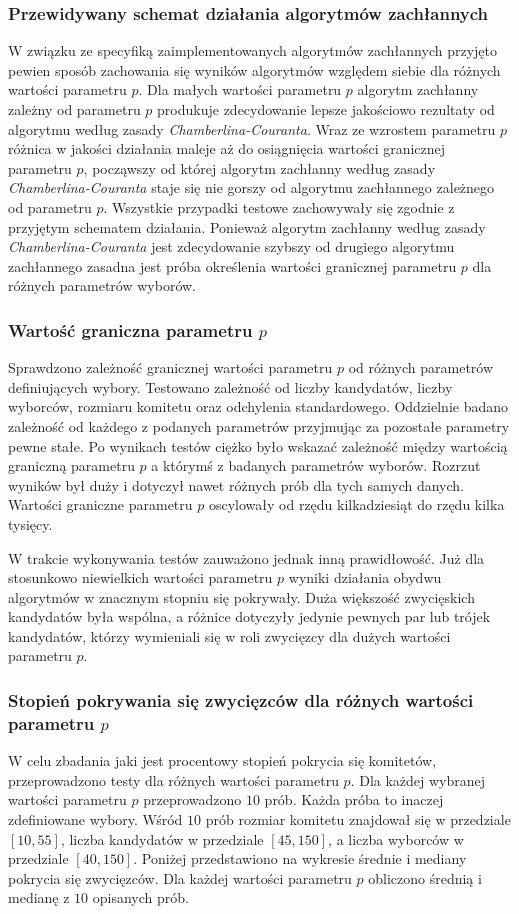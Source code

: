 \documentclass[polish,11pt]{aghthesis}
\begin{document}
\subsubsection{Przewidywany schemat działania algorytmów zachłannych}
W związku ze specyfiką zaimplementowanych algorytmów zachłannych przyjęto pewien sposób zachowania się wyników algorytmów względem siebie dla różnych wartości parametru $p$. Dla małych wartości parametru $p$ algorytm zachłanny zależny od parametru $p$ produkuje zdecydowanie lepsze jakościowo rezultaty od algorytmu według zasady \textit{Chamberlina-Couranta}. Wraz ze wzrostem parametru $p$ różnica w jakości działania maleje aż do osiągnięcia wartości granicznej parametru $p$, począwszy od której algorytm zachłanny według zasady \textit{Chamberlina-Couranta} staje się nie gorszy od algorytmu zachłannego zależnego od parametru $p$. Wszystkie przypadki testowe zachowywały się zgodnie z przyjętym schematem działania.  Ponieważ algorytm zachłanny według zasady \textit{Chamberlina-Couranta} jest zdecydowanie szybszy od drugiego algorytmu zachłannego zasadna jest próba określenia wartości granicznej parametru $p$ dla różnych parametrów wyborów. 

\subsubsection{Wartość graniczna parametru $p$}
Sprawdzono zależność granicznej wartości parametru $p$ od różnych parametrów definiujących wybory. Testowano zależność od liczby kandydatów, liczby wyborców, rozmiaru komitetu oraz odchylenia standardowego. Oddzielnie badano zależność od każdego z podanych parametrów przyjmując za pozostałe parametry pewne stałe. Po wynikach testów ciężko było wskazać zależność między wartością graniczną parametru $p$ a którymś z badanych parametrów wyborów. Rozrzut wyników był duży i dotyczył nawet różnych prób dla tych samych danych. Wartości graniczne parametru $p$ oscylowały od rzędu kilkadziesiąt do rzędu kilka tysięcy. 

\noindent W trakcie wykonywania testów zauważono jednak inną prawidłowość. Już dla stosunkowo niewielkich wartości parametru $p$ wyniki działania obydwu algorytmów w znacznym stopniu się pokrywały. Duża większość zwycięskich kandydatów była wspólna, a różnice dotyczyły jedynie pewnych par lub trójek kandydatów, którzy wymieniali się w roli zwycięzcy dla dużych wartości parametru $p$.

\subsubsection{Stopień pokrywania się zwycięzców dla różnych wartości parametru $p$}
W celu zbadania jaki jest procentowy stopień pokrycia się komitetów, przeprowadzono testy dla różnych wartości parametru $p$. Dla każdej wybranej wartości parametru $p$ przeprowadzono $10$ prób. Każda próba to inaczej zdefiniowane wybory. Wśród $10$ prób rozmiar komitetu znajdował się w przedziale $[10, 55]$, liczba kandydatów w przedziale $[45, 150]$, a liczba wyborców w przedziale $[40, 150]$. Poniżej przedstawiono na wykresie średnie i mediany pokrycia się zwycięzców. Dla każdej wartości parametru $p$ obliczono średnią i medianę z $10$ opisanych prób. 
\end{document}
